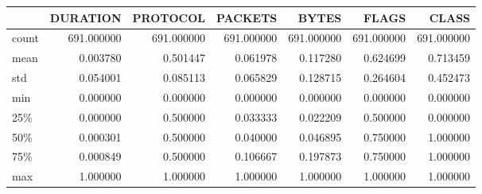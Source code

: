 \begin{tabular}{lrrrrrr}
\toprule
{} &    DURATION &    PROTOCOL &     PACKETS &       BYTES &       FLAGS &       CLASS \\
\midrule
count &  691.000000 &  691.000000 &  691.000000 &  691.000000 &  691.000000 &  691.000000 \\
mean  &    0.003780 &    0.501447 &    0.061978 &    0.117280 &    0.624699 &    0.713459 \\
std   &    0.054001 &    0.085113 &    0.065829 &    0.128715 &    0.264604 &    0.452473 \\
min   &    0.000000 &    0.000000 &    0.000000 &    0.000000 &    0.000000 &    0.000000 \\
25\%   &    0.000000 &    0.500000 &    0.033333 &    0.022209 &    0.500000 &    0.000000 \\
50\%   &    0.000301 &    0.500000 &    0.040000 &    0.046895 &    0.750000 &    1.000000 \\
75\%   &    0.000849 &    0.500000 &    0.106667 &    0.197873 &    0.750000 &    1.000000 \\
max   &    1.000000 &    1.000000 &    1.000000 &    1.000000 &    1.000000 &    1.000000 \\
\bottomrule
\end{tabular}
